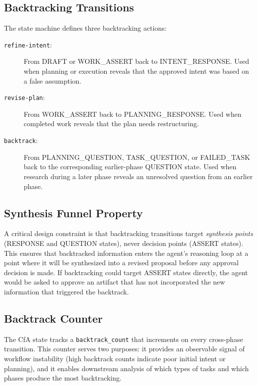 \documentclass[11pt,a4paper]{article}
\begin{document}
\subsection{Backtracking Transitions}

The state machine defines three backtracking actions:

\begin{description}
    \item[\texttt{refine-intent}:] From DRAFT or WORK\_ASSERT back
    to INTENT\_RESPONSE. Used when planning or execution reveals
    that the approved intent was based on a false assumption.

    \item[\texttt{revise-plan}:] From WORK\_ASSERT back to
    PLANNING\_RESPONSE. Used when completed work reveals that
    the plan needs restructuring.

    \item[\texttt{backtrack}:] From PLANNING\_QUESTION,
    TASK\_QUESTION, or FAILED\_TASK back to the corresponding
    earlier-phase QUESTION state. Used when research during a
    later phase reveals an unresolved question from an earlier phase.
\end{description}

\subsection{Synthesis Funnel Property}

A critical design constraint is that backtracking transitions target
\emph{synthesis points} (RESPONSE and QUESTION states), never decision
points (ASSERT states). This ensures that backtracked information enters
the agent's reasoning loop at a point where it will be synthesized into
a revised proposal before any approval decision is made. If
backtracking could target ASSERT states directly, the agent would be
asked to approve an artifact that has not incorporated the new
information that triggered the backtrack.

\subsection{Backtrack Counter}

The CfA state tracks a \texttt{backtrack\_count} that increments on
every cross-phase transition. This counter serves two purposes:
it provides an observable signal of workflow instability (high
backtrack counts indicate poor initial intent or planning), and it
enables downstream analysis of which types of tasks and which phases
produce the most backtracking.
\end{document}

